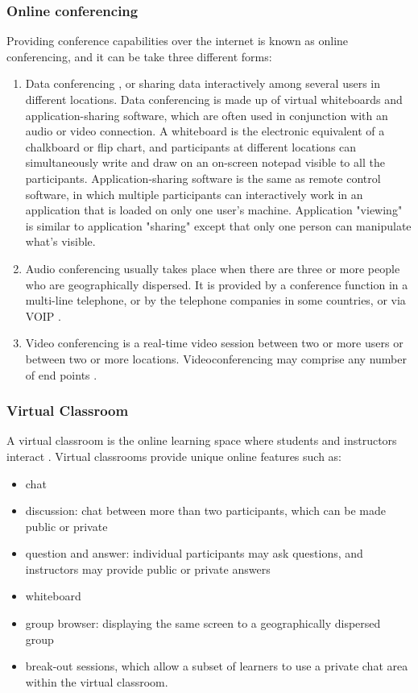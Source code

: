 \documentclass[12pt,a4paper,final,twoside,onecolumn,titlepage]{book}
\begin{document}
\subsubsection{Online conferencing}
Providing conference capabilities over the internet is known as online conferencing, and it can be take three different forms:
\begin{enumerate}
\item Data conferencing \cite{UMIS43}, or sharing data interactively among several users in different locations. Data conferencing is made up of virtual whiteboards and application-sharing software, which are often used in conjunction with an audio or video connection. A whiteboard is the electronic equivalent of a chalkboard or flip chart, and participants at different locations can simultaneously write and draw on an on-screen notepad visible to all the participants. Application-sharing software is the same as remote control software, in which multiple participants can interactively work in an application that is loaded on only one user's machine. Application "viewing" is similar to application "sharing" except that only one person can manipulate what's visible.
\item Audio conferencing usually takes place when there are three or more people who are geographically dispersed. It is provided by a conference function in a multi-line telephone, or by the telephone companies in some countries, or via VOIP \cite{UMIS42}.
\item Video conferencing is a real-time video session between two or more users or between two or more locations. Videoconferencing may comprise any number of end points \cite{UMIS44}.
\end{enumerate}
\subsubsection{Virtual Classroom}
A virtual classroom is the online learning space where students and instructors interact \cite{UMIS32}. Virtual classrooms provide unique online features \cite{UMIS16} such as:
\begin{itemize}
\item chat
\item discussion: chat between more than two participants, which can be made public or private
\item question and answer: individual participants may ask questions, and instructors may provide public or private answers
\item whiteboard
\item group browser: displaying the same screen to a geographically dispersed group
\item break-out sessions, which allow a subset of learners to use a private chat area within the virtual classroom.
\end{itemize}
\end{document}
